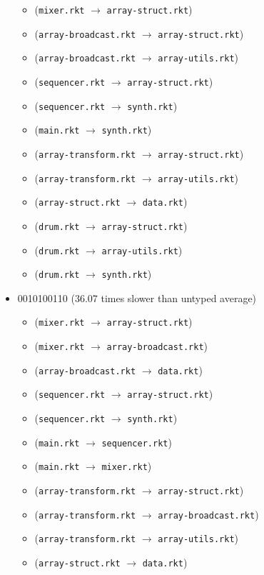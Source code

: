 \documentclass{article}
\newcommand{\mono}[1]{\texttt{#1}}
\begin{document}
\begin{itemize}
\begin{itemize}
  \item (\mono{mixer.rkt} $\rightarrow$ \mono{array-struct.rkt})
  \item (\mono{array-broadcast.rkt} $\rightarrow$ \mono{array-struct.rkt})
  \item (\mono{array-broadcast.rkt} $\rightarrow$ \mono{array-utils.rkt})
  \item (\mono{sequencer.rkt} $\rightarrow$ \mono{array-struct.rkt})
  \item (\mono{sequencer.rkt} $\rightarrow$ \mono{synth.rkt})
  \item (\mono{main.rkt} $\rightarrow$ \mono{synth.rkt})
  \item (\mono{array-transform.rkt} $\rightarrow$ \mono{array-struct.rkt})
  \item (\mono{array-transform.rkt} $\rightarrow$ \mono{array-utils.rkt})
  \item (\mono{array-struct.rkt} $\rightarrow$ \mono{data.rkt})
  \item (\mono{drum.rkt} $\rightarrow$ \mono{array-struct.rkt})
  \item (\mono{drum.rkt} $\rightarrow$ \mono{array-utils.rkt})
  \item (\mono{drum.rkt} $\rightarrow$ \mono{synth.rkt})
  \end{itemize}
\item 0010100110 (36.07 times slower than untyped average)
  \begin{itemize}
  \item (\mono{mixer.rkt} $\rightarrow$ \mono{array-struct.rkt})
  \item (\mono{mixer.rkt} $\rightarrow$ \mono{array-broadcast.rkt})
  \item (\mono{array-broadcast.rkt} $\rightarrow$ \mono{data.rkt})
  \item (\mono{sequencer.rkt} $\rightarrow$ \mono{array-struct.rkt})
  \item (\mono{sequencer.rkt} $\rightarrow$ \mono{synth.rkt})
  \item (\mono{main.rkt} $\rightarrow$ \mono{sequencer.rkt})
  \item (\mono{main.rkt} $\rightarrow$ \mono{mixer.rkt})
  \item (\mono{array-transform.rkt} $\rightarrow$ \mono{array-struct.rkt})
  \item (\mono{array-transform.rkt} $\rightarrow$ \mono{array-broadcast.rkt})
  \item (\mono{array-transform.rkt} $\rightarrow$ \mono{array-utils.rkt})
  \item (\mono{array-struct.rkt} $\rightarrow$ \mono{data.rkt})

\end{itemize}
\end{itemize}
\end{document}

